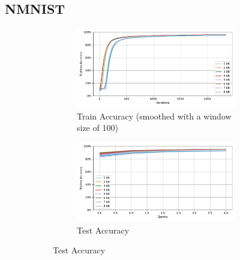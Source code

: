     \subsection{NMNIST}
    \label{appendix:accuracy_curves_nmnist}
        \begin{figure}[H]
            \centering
            \begin{subfigure}[H]{0.69\textwidth}
                \centering
                \begin{subfigure}[H]{\textwidth}
                    \centering
                    \includegraphics[width=\textwidth]{../standard/NMNIST/plots/nmnist_train_acc.pdf}
                    \caption{Train Accuracy (smoothed with a window size of 100)}
                \end{subfigure}
                \hfill
                \begin{subfigure}[H]{\textwidth}
                    \centering
                    \includegraphics[width=\textwidth]{../standard/NMNIST/plots/nmnist_test_acc.pdf}
                    \caption{Test Accuracy}
                \end{subfigure}
            \end{subfigure}
            \hfill
            \begin{subfigure}[H]{0.3\textwidth}

\end{subfigure}
\end{figure}

